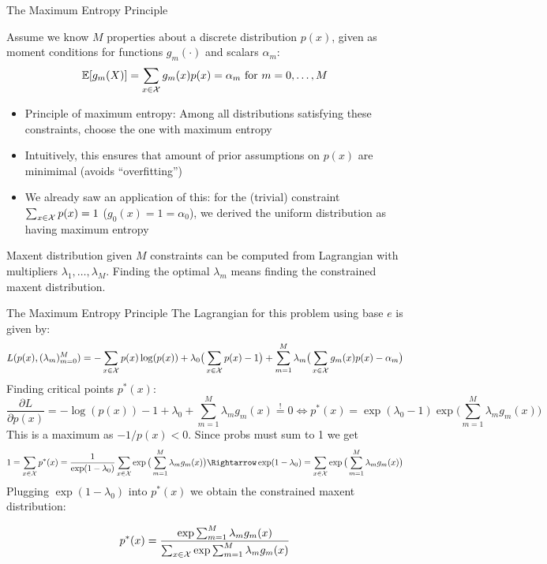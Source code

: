 \documentclass[11pt,compress,t,notes=noshow, xcolor=table]{beamer}
\begin{document}
\begin{vbframe}{The Maximum Entropy Principle }

Assume we know $M$ properties about a discrete distribution $p(x)$, given as moment conditions for functions $g_m(\cdot)$ and scalars $\alpha_m$:
\normalsize{$$\mathbb{E}[g_m(X)]=\sum_{x \in \mathcal{X}}g_m(x)p(x) = \alpha_m\,\,\text{for}\,\, m=0,\ldots,M$$}
\vspace{-0.4cm}
\begin{itemize}
    \item Principle of maximum entropy: Among all distributions satisfying these constraints, choose the one with maximum entropy
    \item Intuitively, this ensures that amount of prior assumptions on $p(x)$ are minimimal (avoids ``overfitting'')
    \item We already saw an application of this: for the (trivial) constraint $\sum_{x \in \mathcal{X}} p(x) = 1$ ($g_0(x)=1=\alpha_0$), we derived the uniform distribution as having maximum entropy 
\end{itemize}
Maxent distribution given $M$ constraints can be computed from Lagrangian with multipliers $\lambda_1,\ldots,\lambda_M$. Finding the optimal $\lambda_m$ means finding the constrained maxent distribution. 
\end{vbframe}

\begin{vbframe}{The Maximum Entropy Principle}
The Lagrangian for this problem using base $e$ is given by:
\small{$$L(p(x),(\lambda_m)_{m=0}^{M}) = - \sum_{x \in \mathcal{X}} p(x) \log(p(x)) + \lambda_0 \big( \sum_{x \in \mathcal{X}} p(x) - 1 \big) + \sum_{m=1}^{M} \lambda_m \big( \sum_{x \in \mathcal{X}} g_m(x)p(x)-\alpha_m \big)$$}
Finding critical points $p^{\ast}(x)$:
$$\frac{\partial L}{\partial p(x)} = -\log(p(x)) -1 + \lambda_0 + \sum_{m=1}^{M} \lambda_m g_m(x) \overset{!}{=} 0 \iff p^{\ast}(x)=\exp(\lambda_0-1)
\exp\big(\sum_{m=1}^{M} \lambda_m g_m(x)\big)$$
This is a maximum as $-1/p(x)<0$. Since probs must sum to 1 we get
$$1=\sum_{x \in \Xspace} p^{\ast}(x)=\frac{1}{\exp(1-\lambda_0)} \sum_{x \in \Xspace} \exp\big(\sum_{m=1}^{M} \lambda_m g_m(x)\big) \Rightarrow \exp(1-\lambda_0)=\sum_{x \in \Xspace} \exp\big(\sum_{m=1}^{M} \lambda_m g_m(x)\big)$$
Plugging $\exp(1-\lambda_0)$ into $p^{\ast}(x)$ we obtain the constrained maxent distribution:

$$p^{\ast}(x)=\frac{\exp{\sum_{m=1}^{M}\lambda_m g_m(x)}}{\sum_{x \in \mathcal{X}} \exp{\sum_{m=1}^{M}\lambda_m g_m(x)}}$$


\end{vbframe}



\endlecture
\end{document}
